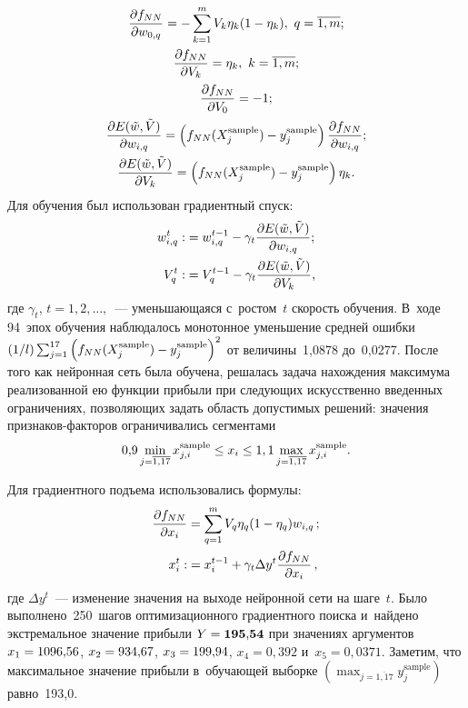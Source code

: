\begin{multicols}{2}
\noindent
\begin{gather*}
\displaystyle\frac{\displaystyle \partial f_{NN}\mathstrut}{\displaystyle \partial w_{0,q}\mathstrut}=
-\sum\limits_{k=1}^m V_k \eta_k (1 - \eta_k), \ q=\overline{1,m}; \\
\displaystyle\frac{\displaystyle \partial f_{NN}\mathstrut}{\displaystyle \partial V_k\mathstrut}=\eta_k, \ k=\overline{1,m}; \\
\displaystyle\frac{\displaystyle \partial f_{NN}\mathstrut}{\displaystyle \partial V_0\mathstrut}=-1;\\
\displaystyle\frac{\displaystyle \partial E(\tilde{w},\tilde{V})\mathstrut}{\displaystyle \partial w_{i,q}\mathstrut}= 
\left( f_{NN}(X_j^{\mathrm{sample}})-y_j^{\mathrm{sample}} \right) 
\displaystyle\frac{\displaystyle \partial f_{NN}\mathstrut}{\displaystyle \partial w_{i,q}\mathstrut}; \\
\displaystyle\frac{\displaystyle \partial E(\tilde{w},\tilde{V})\mathstrut}{\displaystyle \partial V_{k}\mathstrut}=\left( 
f_{NN}(X_j^{\mathrm{sample}})-y_j^{\mathrm{sample}} \right)\eta_k. 
\end{gather*}
Для обучения был использован градиентный спуск:
\begin{align*}
w_{i,q}^t:&=w_{i,q}^{t-1}-\gamma_t \displaystyle\frac{\displaystyle \partial E(\tilde{w},\tilde{V})\mathstrut}{\displaystyle \partial w_{i,q}\mathstrut}; \\
 V_q^t:&=V_q^{t-1}-\gamma_t \displaystyle\frac{\displaystyle \partial E(\tilde{w},\tilde{V})\mathstrut}{\displaystyle \partial V_{k}\mathstrut},
 \end{align*}
 где $\gamma_t$, $t=1,2,\ldots ,$~---  уменьшающаяся с~ростом~$t$ 
 скорость обучения.
В~ходе 94~эпох обучения наблюдалось монотонное уменьшение средней ошибки
 $({1}/{l})\sum\nolimits_{j=1}^{17}\left(f_{NN}(X_j^{\mathrm{sample}})\hm-
 y_j^{\mathrm{sample}}\right)^2$   
 от величины~1,0878   до~0,0277. После того как нейронная сеть была 
 обучена, решалась задача нахождения максимума реализованной ею
  функции прибыли  при следующих искусственно введенных 
  ограничениях, позволяющих задать об\-ласть до\-пус\-ти\-мых 
  решений: значения при\-зна\-ков-фак\-то\-ров ограничивались сегментами  
   $$
   0{,}9\min\limits_{j=\overline{1{,}17}} x_{j,i}^{\mathrm{sample}} \leq x_i 
   \hm\leq 1,1\max\limits_{j=\overline{1,17}} x_{j,i}^{\mathrm{sample}}.
   $$
    
   Для градиентного подъема использовались формулы:
\begin{align*}
\displaystyle\frac{\displaystyle \partial f_{NN}\mathstrut}{\displaystyle \partial x_i\mathstrut}&= 
\sum\limits_{q=1}^m V_q \eta_q (1-\eta_q) w_{i,q}\,; \\
 x_i^t:&=x_i^{t-1}+\gamma_t \Delta y^t \displaystyle\frac{\displaystyle \partial f_{NN}\mathstrut}{\displaystyle \partial x_i\mathstrut}\,,
 \end{align*}
где $\Delta y^t$~--- изменение значения на выходе нейронной сети на шаге~$t$.
Было выполнено~250~шагов  оптимизационного градиентного поиска и~найдено 
экстремальное значение прибыли $Y \hm=  {\mathbf{195{,}54}}$  
при значениях аргументов $x_1\hm= 1096{,}56$,   
$x_2\hm= 934{,}67$,   $x_3\hm= 199{,}94$,  
$x_4 =  0{,}392$ и~$x_5 = 0{,}0371$. Заметим, что максимальное 
значение прибыли в~обучающей выборке $\left(\max_{j=\overline{1{,}17}} 
y_j^{\mathrm{sample}}\right)$ равно~193,0.





\end{multicols}
